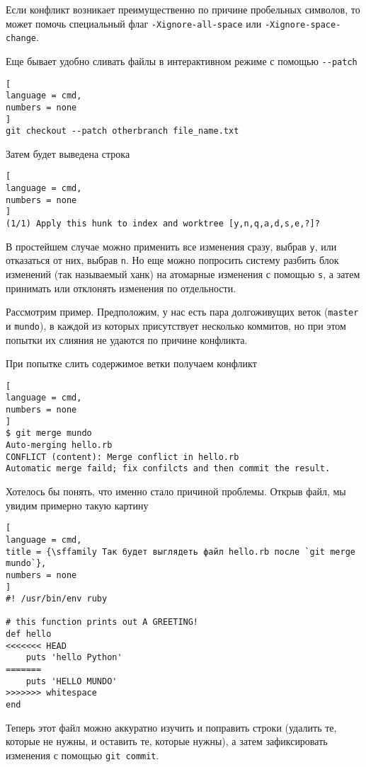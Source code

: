 \documentclass[%
	11pt,
	a4paper,
	utf8,
		]{article}
\begin{document}
Если конфликт возникает преимущественно по причине пробельных символов, то может помочь специальный флаг \verb|-Xignore-all-space| или \verb|-Xignore-space-change|.

Еще бывает удобно сливать файлы в интерактивном режиме с помощью \verb|--patch|
\begin{lstlisting}[
language = cmd,
numbers = none
]
git checkout --patch otherbranch file_name.txt
\end{lstlisting}

Затем будет выведена строка
\begin{lstlisting}[
language = cmd,
numbers = none
]
(1/1) Apply this hunk to index and worktree [y,n,q,a,d,s,e,?]?
\end{lstlisting}

В простейшем случае можно применить все изменения сразу, выбрав \texttt{y}, или отказаться от них, выбрав \texttt{n}. Но еще можно попросить систему разбить блок изменений (так называемый ханк) на атомарные изменения с помощью \texttt{s}, а затем принимать или отклонять изменения по отдельности.

Рассмотрим пример. Предположим, у нас есть пара долгоживущих веток (\texttt{master} и \texttt{mundo}), в каждой из которых присутствует несколько коммитов, но при этом попытки их слияния не удаются по причине конфликта.

При попытке слить содержимое ветки получаем конфликт
\begin{lstlisting}[
language = cmd,
numbers = none
]
$ git merge mundo
Auto-merging hello.rb
CONFLICT (content): Merge conflict in hello.rb
Automatic merge faild; fix confilcts and then commit the result.
\end{lstlisting}

Хотелось бы понять, что именно стало причиной проблемы. Открыв файл, мы увидим примерно такую картину
\begin{lstlisting}[
language = cmd,
title = {\sffamily Так будет выглядеть файл hello.rb после `git merge mundo`},
numbers = none
]
#! /usr/bin/env ruby

# this function prints out A GREETING!
def hello
<<<<<<< HEAD
    puts 'hello Python'
=======
    puts 'HELLO MUNDO'
>>>>>>> whitespace
end

\end{lstlisting}

Теперь этот файл можно аккуратно изучить и поправить строки (удалить те, которые не нужны, и оставить те, которые нужны), а затем зафиксировать изменения с помощью \texttt{git commit}.
\end{document}
